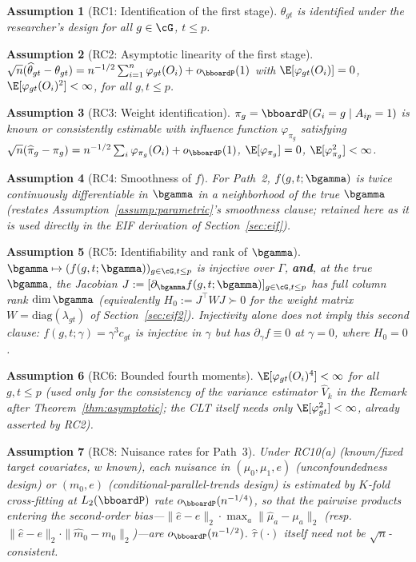 \documentclass{article}
\renewcommand{\P}{\bboardP}
\newtheorem{assumption}{Assumption}
\begin{document}
\begin{assumption}[RC1: Identification of the first stage]\label{RC1}
$\theta_{gt}$ is identified under the researcher's design for all $g \in \cG$, $t \leq p$.
\end{assumption}
\begin{assumption}[RC2: Asymptotic linearity of the first stage]\label{RC2}
$\sqrt{n}(\widehat\theta_{gt} - \theta_{gt}) = n^{-1/2}\sum_{i=1}^n \varphi_{gt}(O_i) + o_\P(1)$ with $\E[\varphi_{gt}(O_i)] = 0$, $\E[\varphi_{gt}(O_i)^2]<\infty$, for all $g,t\leq p$.
\end{assumption}
\begin{assumption}[RC3: Weight identification]\label{RC3}
$\pi_g = \P(G_i=g\mid A_{ip}=1)$ is known or consistently estimable with influence function $\varphi_{\pi_g}$ satisfying $\sqrt n(\widehat\pi_g - \pi_g) = n^{-1/2}\sum_i \varphi_{\pi_g}(O_i) + o_\P(1)$, $\E[\varphi_{\pi_g}]=0$, $\E[\varphi_{\pi_g}^2]<\infty$.
\end{assumption}
\begin{assumption}[RC4: Smoothness of $f$]\label{RC4}
For Path~2, $f(g,t;\bgamma)$ is twice continuously differentiable in $\bgamma$ in a neighborhood of the true $\bgamma$ (restates Assumption~\ref{assump:parametric}'s smoothness clause; retained here as it is used directly in the EIF derivation of Section~\ref{sec:eif}).
\end{assumption}
\begin{assumption}[RC5: Identifiability and rank of $\bgamma$]\label{RC5}
$\bgamma \mapsto (f(g,t;\bgamma))_{g\in\cG,t\leq p}$ is injective over $\Gamma$, \textbf{and}, at the true $\bgamma$, the Jacobian $J := [\partial_{\bgamma} f(g,t;\bgamma)]_{g\in\cG,t\leq p}$ has full column rank $\dim\bgamma$ (equivalently $H_0 := J^\top W J \succ 0$ for the weight matrix $W=\mathrm{diag}(\lambda_{gt})$ of Section~\ref{sec:eif2}). Injectivity alone does not imply this second clause: $f(g,t;\gamma)=\gamma^3 c_{gt}$ is injective in $\gamma$ but has $\partial_\gamma f\equiv0$ at $\gamma=0$, where $H_0=0$.
\end{assumption}
\begin{assumption}[RC6: Bounded fourth moments]\label{RC6}
$\E[\varphi_{gt}(O_i)^4]<\infty$ for all $g,t\leq p$ (used only for the consistency of the variance estimator $\widehat V_k$ in the Remark after Theorem~\ref{thm:asymptotic}; the CLT itself needs only $\E[\varphi_{gt}^2]<\infty$, already asserted by RC2).
\end{assumption}
\begin{assumption}[RC8: Nuisance rates for Path~3]\label{RC8}
Under RC10(a) (known/fixed target covariates, $w$ known), each nuisance in $(\mu_0,\mu_1,e)$ (unconfoundedness design) or $(m_0,e)$ (conditional-parallel-trends design) is estimated by $K$-fold cross-fitting at $L_2(\P)$ rate $o_\P(n^{-1/4})$, so that the pairwise products entering the second-order bias---$\|\widehat e-e\|_2\cdot\max_a\|\widehat\mu_a-\mu_a\|_2$ (resp.\ $\|\widehat e-e\|_2\cdot\|\widehat m_0-m_0\|_2$)---are $o_\P(n^{-1/2})$. $\widehat\tau(\cdot)$ itself need not be $\sqrt n$-consistent.
\end{assumption}
\end{document}
